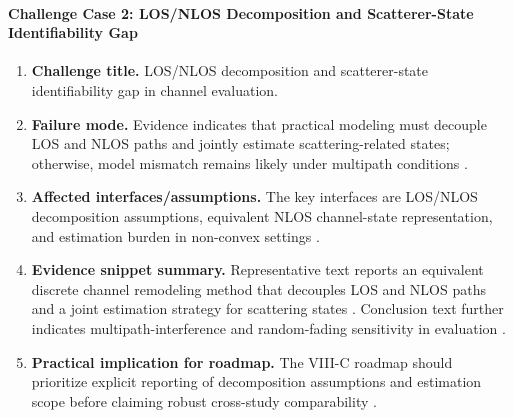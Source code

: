 \paragraph{Challenge Case 2: LOS/NLOS Decomposition and Scatterer-State Identifiability Gap}
\begin{enumerate}
    \item \textbf{Challenge title.} LOS/NLOS decomposition and scatterer-state identifiability gap in channel evaluation.
    \item \textbf{Failure mode.} Evidence indicates that practical modeling must decouple LOS and NLOS paths and jointly estimate scattering-related states; otherwise, model mismatch remains likely under multipath conditions \cite{O_ISAC_050}.
    \item \textbf{Affected interfaces/assumptions.} The key interfaces are LOS/NLOS decomposition assumptions, equivalent NLOS channel-state representation, and estimation burden in non-convex settings \cite{O_ISAC_050}.
    \item \textbf{Evidence snippet summary.} Representative text reports an equivalent discrete channel remodeling method that decouples LOS and NLOS paths and a joint estimation strategy for scattering states \cite{O_ISAC_050}. Conclusion text further indicates multipath-interference and random-fading sensitivity in evaluation \cite{O_ISAC_050}.
    \item \textbf{Practical implication for roadmap.} The VIII-C roadmap should prioritize explicit reporting of decomposition assumptions and estimation scope before claiming robust cross-study comparability \cite{O_ISAC_050}.
\end{enumerate}

